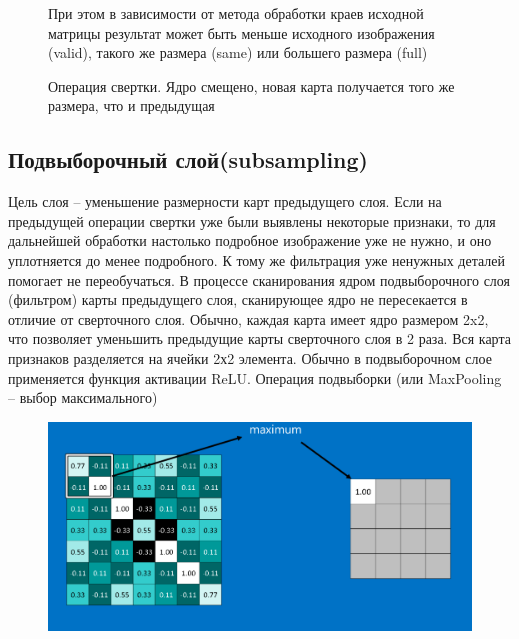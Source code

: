 \documentclass[paper=a4, fontsize=11pt]{scrartcl} %
\numberwithin{equation}{section} %
\numberwithin{figure}{section} %
\numberwithin{table}{section} %
\begin{document}
	\begin{figure}[!h]
			При этом в зависимости от метода обработки краев исходной матрицы результат может быть меньше исходного изображения (valid), такого же размера (same) или большего размера (full)
	\end{figure}


	\begin{figure}[h!]
	\end{figure}
	
	\begin{figure}[h!]
		\begin{frame}{Операция свертки. Ядро смещено, новая карта получается того же размера, что и предыдущая}
			\centering
		\end{frame}
	\end{figure}
	
	\subsection{Подвыборочный слой(subsampling)}
	
	Цель слоя – уменьшение размерности карт предыдущего слоя. Если на предыдущей операции свертки уже были выявлены некоторые признаки, то для дальнейшей обработки настолько подробное изображение уже не нужно, и оно уплотняется до менее подробного. К тому же фильтрация уже ненужных деталей помогает не переобучаться. В процессе сканирования ядром подвыборочного слоя (фильтром) карты предыдущего слоя, сканирующее ядро не пересекается в отличие от сверточного слоя. Обычно, каждая карта имеет ядро размером 2x2, что позволяет уменьшить предыдущие карты сверточного слоя в 2 раза. Вся карта признаков разделяется на ячейки 2х2 элемента.
	Обычно в подвыборочном слое применяется функция активации ReLU. Операция подвыборки (или MaxPooling – выбор максимального) 
	
	\begin{figure}[h]
		\centering
		\includegraphics[scale=0.5]{pool}
	\end{figure}
\end{document}
